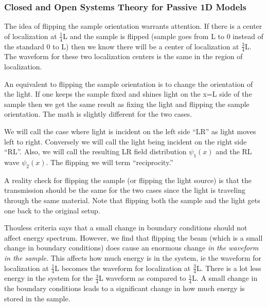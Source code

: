 \subsubsection {Closed and Open Systems Theory for Passive 1D Models}

The idea of flipping the sample orientation warrants
attention.  If there is a center of localization
at $ \frac{1}{4} $L and
the sample is flipped (sample goes from L to 0 instead
of the standard 0 to L) then we know there will be a center
of localization at $ \frac{3}{4} $L.  The waveform for
these two localization centers is the same in the region
of localization.

An equivalent to flipping the sample orientation is
to change the orientation of the light.  If one keeps
the sample fixed and shines light on the x=L side of the
sample then we get the same result as fixing the light and
flipping the sample orientation.  The math is slightly
different for the two cases. %

We will call the case where light is incident on the left side ``LR''
as light moves left to right. Conversely we will call the
light being incident on the right side ``RL''.  Also,
we will call the resulting LR field 
distribution $ \psi _1(x) $ and the RL wave $ \psi  _2(x) $. 
The flipping we will term ``reciprocity.'' 

A reality check for flipping the sample (or flipping the
light source) is that the transmission should be the same for the
two cases since the light is traveling through the
same material.  Note that flipping both the sample and the
light gets one back to the original setup.

Thouless criteria says that a small change in boundary
conditions should not affect energy spectrum. However, we 
find that flipping the beam (which is a small change
in boundary conditions) does cause an enormous 
change {\it in the waveform in the sample}. This  affects
how much energy is in the system, ie the waveform for
localization at $ \frac{1}{4} $L becomes the
waveform for localization at $ \frac{3}{4} $L.
There is a lot less energy in the system for the
$ \frac{3}{4} $L waveform as compared to $ \frac{1}{4} $L. A
small change in the boundary conditions leads to
a significant change in how much energy is stored
in the sample.

